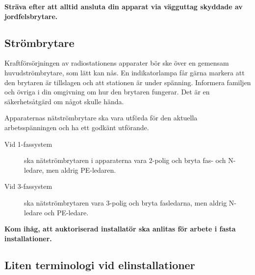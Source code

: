 \begin{center}
\begin{minipage}{0.19\columnwidth}
\Huge{\selectfont{}\relax}
\end{minipage}
\begin{minipage}{0.7\columnwidth}
\textbf{Sträva efter att alltid ansluta din apparat via vägguttag
	skyddade av jordfelsbrytare.}
\end{minipage}
\end{center}


\subsection{Strömbrytare}

Kraftförsörjningen av radiostationens apparater bör ske över en
gemensam huvudströmbrytare, som lätt kan nås.
En indikatorlampa får gärna markera att den brytaren är tillslagen och att
stationen är under spänning.
Informera familjen och övriga i din omgivning om hur den brytaren fungerar.
Det är en säkerhetsåtgärd om något skulle hända.

Apparaternas nätströmbrytare ska vara utförda för den aktuella arbetsspänningen
och ha ett godkänt utförande.

\begin{description}
\item[Vid 1-fassystem] ska nätströmbrytaren i apparaterna vara 2-polig och bryta fas-
och N-ledare, men aldrig PE-ledaren.

\item[Vid 3-fassystem] ska nätströmbrytaren vara 3-polig och bryta fasledarna, men
aldrig N-ledare och PE-ledare.
\end{description}

\begin{center}
\begin{minipage}{0.19\columnwidth}
\Huge{\selectfont{}\relax}
\end{minipage}
\begin{minipage}{0.7\columnwidth}
\textbf{Kom ihåg, att auktoriserad installatör ska anlitas för arbete
i fasta installationer.}
\end{minipage}
\end{center}

\subsection{Liten terminologi vid elinstallationer}

